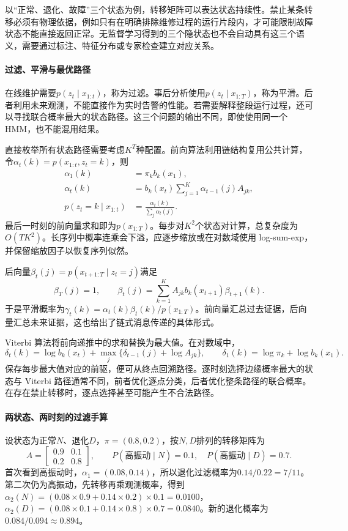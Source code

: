 以“正常、退化、故障”三个状态为例，转移矩阵可以表达状态持续性。禁止某条转移必须有物理依据，例如只有在明确排除维修过程的运行片段内，才可能限制故障状态不能直接返回正常。无监督学习得到的三个隐状态也不会自动具有这三个语义，需要通过标注、特征分布或专家检查建立对应关系。

\paragraph{过滤、平滑与最优路径}
在线维护需要$p(z_t\mid x_{1:t})$，称为过滤。事后分析使用$p(z_t\mid x_{1:T})$，称为平滑。后者利用未来观测，不能直接作为实时告警的性能。若需要解释整段运行过程，还可以寻找联合概率最大的状态路径。这三个问题的输出不同，即使使用同一个 HMM，也不能混用结果。

直接枚举所有状态路径需要考虑$K^T$种配置。前向算法利用链结构复用公共计算，令$\alpha_t(k)=p(x_{1:t},z_t=k)$，则
\begin{align}
 \alpha_1(k)&=\pi_kb_k(x_1),\\
 \alpha_t(k)&=b_k(x_t)\sum_{j=1}^{K}\alpha_{t-1}(j)A_{jk},\\
 p(z_t=k\mid x_{1:t})&=\frac{\alpha_t(k)}{\sum_j\alpha_t(j)}.
\end{align}
最后一时刻的前向量求和即为$p(x_{1:T})$。每步对$K^2$个状态对计算，总复杂度为$O(TK^2)$。长序列中概率连乘会下溢，应逐步缩放或在对数域使用 log-sum-exp，并保留缩放因子以恢复序列似然。

后向量$\beta_t(j)=p(x_{t+1:T}\mid z_t=j)$满足
\begin{equation}
 \beta_T(j)=1,\qquad
 \beta_t(j)=\sum_{k=1}^{K}A_{jk}b_k(x_{t+1})\beta_{t+1}(k).
\end{equation}
于是平滑概率为$\gamma_t(k)=\alpha_t(k)\beta_t(k)/p(x_{1:T})$。前向量汇总过去证据，后向量汇总未来证据，这也给出了链式消息传递的具体形式。

Viterbi 算法将前向递推中的求和替换为最大值。在对数域中，
\begin{equation}
 \delta_t(k)=\log b_k(x_t)+\max_j\{\delta_{t-1}(j)+\log A_{jk}\},
 \qquad \delta_1(k)=\log\pi_k+\log b_k(x_1).
\end{equation}
保存每步最大值对应的前驱，便可从终点回溯路径。逐时刻选择边缘概率最大的状态与 Viterbi 路径通常不同，前者优化逐点分类，后者优化整条路径的联合概率。在存在禁止转移时，逐点选择甚至可能产生不合法路径。

\paragraph{两状态、两时刻的过滤手算}
设状态为正常$N$、退化$D$，$\pi=(0.8,0.2)$，按$N,D$排列的转移矩阵为
\begin{equation}
 A=\begin{bmatrix}0.9&0.1\\0.2&0.8\end{bmatrix},\qquad
 P(\text{高振动}\mid N)=0.1,\quad P(\text{高振动}\mid D)=0.7.
\end{equation}
首次看到高振动时，$\alpha_1=(0.08,0.14)$，所以退化过滤概率为$0.14/0.22=7/11$。第二次仍为高振动，先转移再乘观测概率，得到$\alpha_2(N)=(0.08\times0.9+0.14\times0.2)\times0.1=0.0100$，$\alpha_2(D)=(0.08\times0.1+0.14\times0.8)\times0.7=0.0840$。新的退化概率为$0.084/0.094\approx0.894$。

